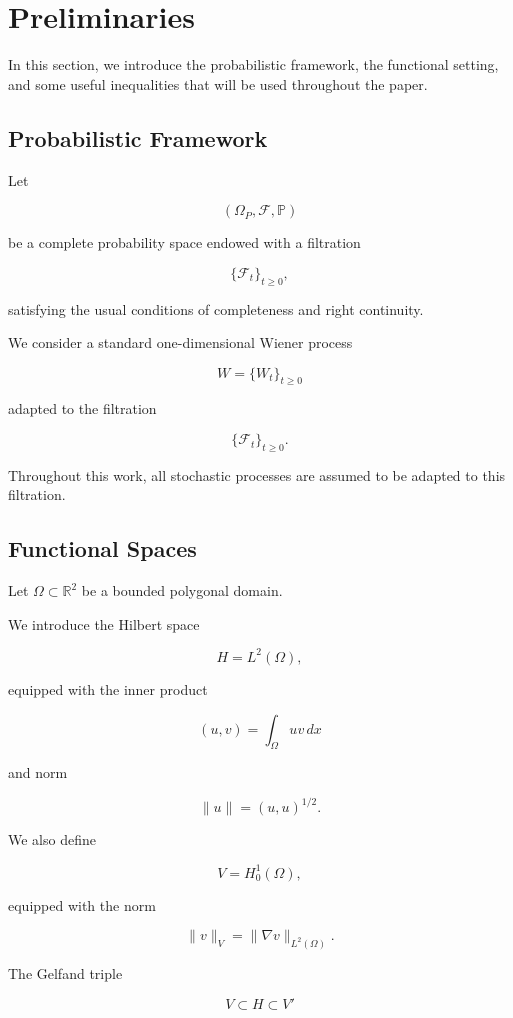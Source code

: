 \section{Preliminaries}

In this section, we introduce the probabilistic framework, the functional setting, and some useful inequalities that will be used throughout the paper.

\subsection{Probabilistic Framework}

Let

\[
(\Omega_P,\mathcal F,\mathbb P)
\]

be a complete probability space endowed with a filtration

\[
\{\mathcal F_t\}_{t\ge0},
\]

satisfying the usual conditions of completeness and right continuity.

We consider a standard one-dimensional Wiener process

\[
W=\{W_t\}_{t\ge0}
\]

adapted to the filtration

\[
\{\mathcal F_t\}_{t\ge0}.
\]

Throughout this work, all stochastic processes are assumed to be adapted to this filtration.

\subsection{Functional Spaces}

Let $\Omega\subset\mathbb R^2$ be a bounded polygonal domain.

We introduce the Hilbert space

\[
H=L^2(\Omega),
\]

equipped with the inner product

\[
(u,v)
=
\int_\Omega uv\,dx
\]

and norm

\[
\|u\|
=
(u,u)^{1/2}.
\]

We also define

\[
V=H_0^1(\Omega),
\]

equipped with the norm

\[
\|v\|_V
=
\|\nabla v\|_{L^2(\Omega)}.
\]

The Gelfand triple

\[
V
\subset
H
\subset
V'
\]

